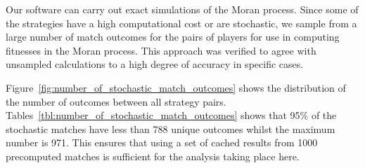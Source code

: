 \documentclass{article}
\begin{document}
Our software can carry out exact simulations of the Moran process. Since some of
the strategies have a high computational cost or are stochastic, we sample
from a large number of match outcomes for the pairs of players for use in computing
fitnesses in the Moran process. This approach was verified to agree with unsampled
calculations to a high degree of accuracy in specific cases.

Figure~\ref{fig:number_of_stochastic_match_outcomes} shows the distribution of
the number of outcomes between all strategy pairs.
Tables~\ref{tbl:number_of_stochastic_match_outcomes} shows that 95\% of the
stochastic matches have less than 788 unique outcomes whilst the maximum number
is 971. This ensures that using a set of cached results from 1000 precomputed
matches is sufficient for the analysis taking place here.
\end{document}
